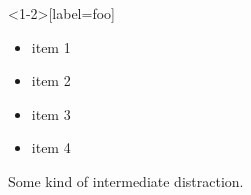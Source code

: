 \documentclass{beamer}
\begin{document}
\begin{frame}<1-2>[label=foo]
\begin{itemize}
  \item<1-> item 1 %
  \item<2-> item 2 %
  \item<3-> item 3 %
  \item<4-> item 4 %
\end{itemize}
\end{frame}

\begin{frame}
Some kind of intermediate distraction.
\end{frame}

\end{document}
